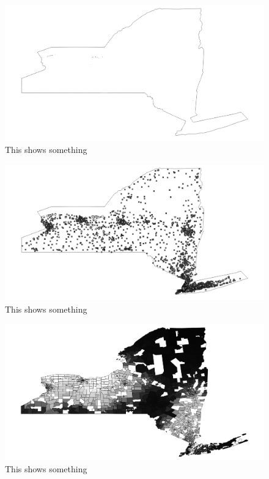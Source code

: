 \documentclass{report}
\begin{document}
\begin{figure}
\centering
\begin{framed}
\includegraphics[scale=.4]{farms_66}
\caption{This shows something}
\label{fig:farms_66}
\end{framed}
\end{figure}

\begin{figure}
\centering
\begin{framed}
\includegraphics[scale=.4]{network_66}
\caption{This shows something}
\end{framed}
\end{figure}

\begin{figure}
\centering
\begin{framed}
\includegraphics[scale=.4]{prices_66}
\caption{This shows something}
\end{framed}
\end{figure}
\end{document}
